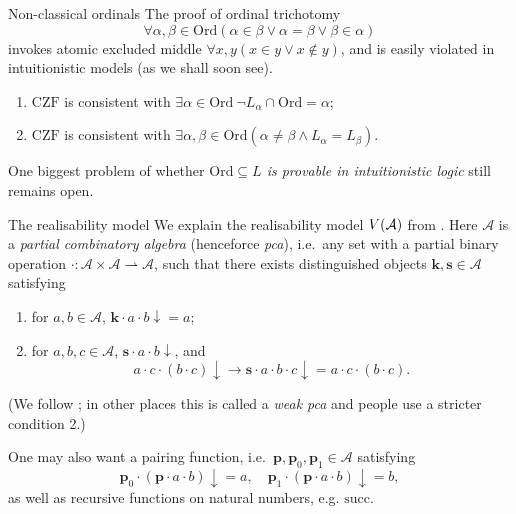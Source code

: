 \documentclass{beamer}
\begin{document}
\begin{frame}{Non-classical ordinals}
  The proof of ordinal trichotomy
  \[\forall \alpha, \beta \in \mathrm{Ord} \left(\alpha \in \beta \lor \alpha = \beta \lor \beta \in \alpha\right)\]
  invokes atomic excluded middle $\forall x, y \left(x \in y \lor x \not\in y\right)$, and is easily violated in intuitionistic models (as we shall soon see).

  \vspace{0.6em}

  \begin{theorem}
    \begin{enumerate}
      \item $\mathrm{CZF}$ is consistent with $\exists \alpha \in \mathrm{Ord} \ \neg L_\alpha \cap \mathrm{Ord} = \alpha$;
      \item $\mathrm{CZF}$ is consistent with $\exists \alpha, \beta \in \mathrm{Ord} \left(\alpha \neq \beta \land L_\alpha = L_\beta\right)$.
    \end{enumerate}
  \end{theorem}

  \vspace{0.6em}

  One biggest problem of whether \emph{$\mathrm{Ord} \subseteq L$ is provable in intuitionistic logic} still remains open.
\end{frame}

\begin{frame}{The realisability model}
  We explain the realisability model $V\mleft(\mathcal{A}\mright)$ from . Here $\mathcal{A}$ is a \emph{partial combinatory algebra} (henceforce \emph{pca}), i.e.\ any set with a partial binary operation $\cdot : \mathcal{A} \times \mathcal{A} \rightharpoonup \mathcal{A}$, such that there exists distinguished objects $\mathbf{k}, \mathbf{s} \in \mathcal{A}$ satisfying
  \begin{enumerate}
    \item for $a, b \in \mathcal{A}$, $\mathbf{k} \cdot a \cdot b {\downarrow} = a$;
    \item for $a, b, c \in \mathcal{A}$, $\mathbf{s} \cdot a \cdot b {\downarrow}$, and
          \[a \cdot c \cdot (b \cdot c) {\downarrow} \rightarrow \mathbf{s} \cdot a \cdot b \cdot c {\downarrow} = a \cdot c \cdot (b \cdot c).\]
  \end{enumerate}
  (We follow ; in other places this is called a \emph{weak pca} and people use a stricter condition 2.)

  \vspace{1em}

  One may also want a pairing function, i.e.\ $\mathbf{p}, \mathbf{p}_0, \mathbf{p}_1 \in \mathcal{A}$ satisfying
  \[\mathbf{p}_0 \cdot \left(\mathbf{p} \cdot a \cdot b\right) {\downarrow} = a, \quad \mathbf{p}_1 \cdot \left(\mathbf{p} \cdot a \cdot b\right) {\downarrow} = b,\]
  as well as recursive functions on natural numbers, e.g. $\mathrm{succ}$.
\end{frame}
\end{document}
